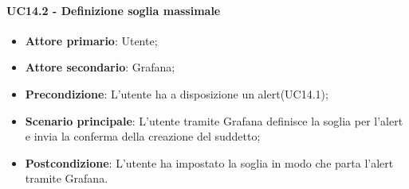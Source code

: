 \paragraph{UC14.2 - Definizione soglia massimale}
\label{para:uc14.2}
\begin{itemize}
  \item \textbf{Attore primario}: Utente;
  \item \textbf{Attore secondario}: Grafana;
  \item \textbf{Precondizione}: L'utente ha a disposizione un alert(UC14.1);
  \item \textbf{Scenario principale}: L'utente tramite Grafana definisce la soglia per l'alert e invia la conferma della creazione del suddetto;
  \item \textbf{Postcondizione}: L'utente ha impostato la soglia in modo che parta l'alert tramite Grafana.
\end{itemize}
